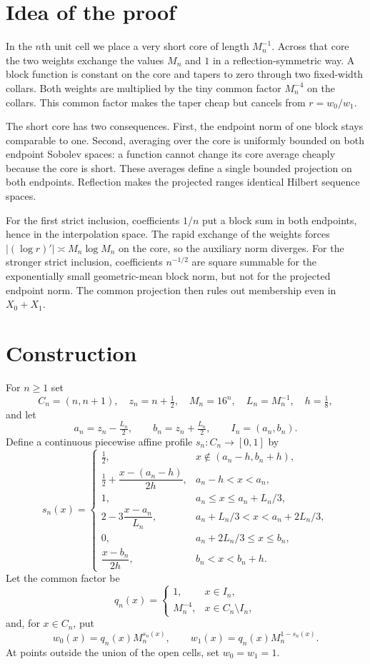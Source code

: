 \documentclass[11pt]{article}
\theoremstyle{remark}
\begin{document}
\section{Idea of the proof}

In the $n$th unit cell we place a very short core of length $M_n^{-1}$.
Across that core the two weights exchange the values $M_n$ and $1$ in a
reflection-symmetric way.  A block function is constant on the core and
tapers to zero through two fixed-width collars.  Both weights are multiplied
by the tiny common factor $M_n^{-4}$ on the collars.  This common factor makes
the taper cheap but cancels from $r=w_0/w_1$.

The short core has two consequences.  First, the endpoint norm of one block
stays comparable to one.  Second, averaging over the core is uniformly
bounded on both endpoint Sobolev spaces: a function cannot change its core
average cheaply because the core is short.  These averages define a single
bounded projection on both endpoints.  Reflection makes the projected ranges
identical Hilbert sequence spaces.

For the first strict inclusion, coefficients $1/n$ put a block sum in both
endpoints, hence in the interpolation space.  The rapid exchange of the
weights forces $|(\log r)'|\asymp M_n\log M_n$ on the core, so the auxiliary
norm diverges.  For the stronger strict inclusion, coefficients $n^{-1/2}$
are square summable for the exponentially small geometric-mean block norm,
but not for the projected endpoint norm.  The common projection then rules
out membership even in $X_0+X_1$.

\section{Construction}

For $n\geq1$ set
\[
 C_n=(n,n+1),\quad z_n=n+\tfrac12,\quad
 M_n=16^n,\quad L_n=M_n^{-1},\quad h=\tfrac18,
\]
and let
\[
 a_n=z_n-\tfrac{L_n}{2},\qquad b_n=z_n+\tfrac{L_n}{2},
 \qquad I_n=(a_n,b_n).
\]
Define a continuous piecewise affine profile $s_n:C_n\to[0,1]$ by
\begin{equation}\label{eq:profile}
s_n(x)=
\begin{cases}
\frac12,&x\notin(a_n-h,b_n+h),\\
\frac12+\dfrac{x-(a_n-h)}{2h},&a_n-h<x<a_n,\\
1,&a_n\leq x\leq a_n+L_n/3,\\
2-3\dfrac{x-a_n}{L_n},&a_n+L_n/3<x<a_n+2L_n/3,\\
0,&a_n+2L_n/3\leq x\leq b_n,\\
\dfrac{x-b_n}{2h},&b_n<x<b_n+h.
\end{cases}
\end{equation}
Let the common factor be
\[
 q_n(x)=
 \begin{cases}1,&x\in I_n,\\ M_n^{-4},&x\in C_n\setminus I_n,
 \end{cases}
\]
and, for $x\in C_n$, put
\begin{equation}\label{eq:weights}
 w_0(x)=q_n(x)M_n^{s_n(x)},\qquad
 w_1(x)=q_n(x)M_n^{1-s_n(x)}.
\end{equation}
At points outside the union of the open cells, set $w_0=w_1=1$.
\end{document}

